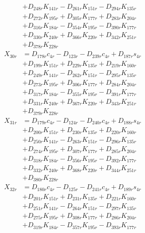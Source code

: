 \begin{multicols}{2}
\begin{align}
&+ D_{248r}K_{141r} - D_{261r}K_{151r} - D_{294r}K_{135r}  \nonumber \\
&+ D_{272r}K_{195r} + D_{305r}K_{177r} + D_{283r}K_{204r}  \nonumber \\
&+ D_{316r}K_{184r} - D_{354r}K_{195r} - D_{390r}K_{177r}  \nonumber \\
&+ D_{330r}K_{240r} + D_{366r}K_{220r} + D_{342r}K_{251r}  \nonumber \\
&+ D_{378r}K_{228r} \nonumber \\
X_{30r} &= D_{178r}c_{4r} - D_{123r} - D_{239r}c_{4r} + D_{187r}s_{4r}  \nonumber \\
&+ D_{199r}K_{151r} + D_{229r}K_{135r} + D_{219r}K_{160r}  \nonumber \\
&+ D_{249r}K_{141r} - D_{262r}K_{151r} - D_{295r}K_{135r}  \nonumber \\
&+ D_{273r}K_{195r} + D_{306r}K_{177r} + D_{284r}K_{204r}  \nonumber \\
&+ D_{317r}K_{184r} - D_{355r}K_{195r} - D_{391r}K_{177r}  \nonumber \\
&+ D_{331r}K_{240r} + D_{367r}K_{220r} + D_{343r}K_{251r}  \nonumber \\
&+ D_{379r}K_{228r} \nonumber \\
X_{31r} &= D_{179r}c_{4r} - D_{124r} - D_{240r}c_{4r} + D_{188r}s_{4r}  \nonumber \\
&+ D_{200r}K_{151r} + D_{230r}K_{135r} + D_{220r}K_{160r}  \nonumber \\
&+ D_{250r}K_{141r} - D_{263r}K_{151r} - D_{296r}K_{135r}  \nonumber \\
&+ D_{274r}K_{195r} + D_{307r}K_{177r} + D_{285r}K_{204r}  \nonumber \\
&+ D_{318r}K_{184r} - D_{356r}K_{195r} - D_{392r}K_{177r}  \nonumber \\
&+ D_{332r}K_{240r} + D_{368r}K_{220r} + D_{344r}K_{251r}  \nonumber \\
&+ D_{380r}K_{228r} \nonumber \\
X_{32r} &= D_{180r}c_{4r} - D_{125r} - D_{241r}c_{4r} + D_{189r}s_{4r}  \nonumber \\
&+ D_{201r}K_{151r} + D_{231r}K_{135r} + D_{221r}K_{160r}  \nonumber \\
&+ D_{251r}K_{141r} - D_{264r}K_{151r} - D_{297r}K_{135r}  \nonumber \\
&+ D_{275r}K_{195r} + D_{308r}K_{177r} + D_{286r}K_{204r}  \nonumber \\
&+ D_{319r}K_{184r} - D_{357r}K_{195r} - D_{393r}K_{177r}  \nonumber \\

\end{align}
\end{multicols}
